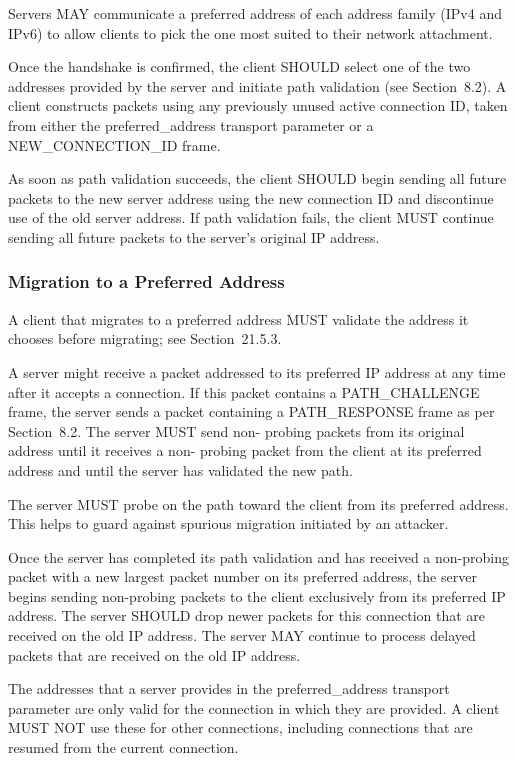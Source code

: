 \documentclass{article}
\begin{document}
Servers MAY communicate a preferred address of each address family (IPv4 and IPv6) to allow clients to pick the one most suited to their network attachment.

Once the handshake is confirmed, the client SHOULD select one of the two addresses provided by the server and initiate path validation (see Section~8.2).  A client constructs packets using any previously unused active connection ID, taken from either the preferred\_address transport parameter or a NEW\_CONNECTION\_ID frame.

As soon as path validation succeeds, the client SHOULD begin sending all future packets to the new server address using the new connection ID and discontinue use of the old server address.  If path validation fails, the client MUST continue sending all future packets to the server's original IP address.

\subsubsection{Migration to a Preferred Address}

A client that migrates to a preferred address MUST validate the address it chooses before migrating; see Section~21.5.3.

A server might receive a packet addressed to its preferred IP address at any time after it accepts a connection.  If this packet contains a PATH\_CHALLENGE frame, the server sends a packet containing a PATH\_RESPONSE frame as per Section~8.2.  The server MUST send non- probing packets from its original address until it receives a non- probing packet from the client at its preferred address and until the server has validated the new path.

The server MUST probe on the path toward the client from its preferred address.  This helps to guard against spurious migration initiated by an attacker.

Once the server has completed its path validation and has received a non-probing packet with a new largest packet number on its preferred address, the server begins sending non-probing packets to the client exclusively from its preferred IP address.  The server SHOULD drop newer packets for this connection that are received on the old IP address.  The server MAY continue to process delayed packets that are received on the old IP address.

The addresses that a server provides in the preferred\_address transport parameter are only valid for the connection in which they are provided.  A client MUST NOT use these for other connections, including connections that are resumed from the current connection.
\end{document}
